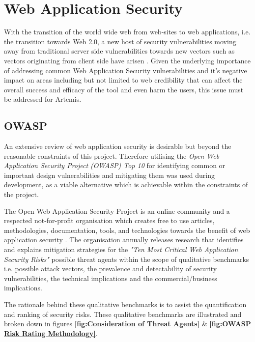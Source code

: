 \section{Web Application Security}

With the transition of the world wide web from web-sites to web applications, i.e. the transition towards Web 2.0, a new host of security vulnerabilities moving away from traditional server side vulnerabilities towards new vectors such as vectors originating from client side have arisen \cite{Dayfdd2011}. Given the underlying importance of addressing common Web Application Security vulnerabilities \cite{Dayfdd2011} and it's negative impact on areas including but not limited to web credibility \cite{Fogg2002a,Fogg1999} that can affect the overall success and efficacy of the tool and even harm the users, this issue must be addressed for Artemis.

\subsection{OWASP}

An extensive review of web application security is desirable but beyond the reasonable constraints of this project. Therefore  utilising the \textit{Open Web Application Security Project (OWASP) Top 10} \cite{OWASP2017} for identifying common or important design vulnerabilities and mitigating them was  used during development, as a viable alternative which is achievable within the constraints of the project.

The Open Web Application Security Project is an online community  and  a respected  not-for-profit organisation which creates free to use articles, methodologies, documentation, tools, and technologies towards the benefit of web application security \cite{OWASP}. The organisation  annually releases research that identifies and explains mitigation strategies for the \textit{"Ten Most Critical Web Application Security Risks"}\cite{OWASP2017} possible threat agents within the scope of qualitative benchmarks i.e. possible attack vectors, the prevalence and detectability of security vulnerabilities, the technical implications and the commercial/business implications.

The rationale behind these qualitative benchmarks is to assist the quantification and ranking of security risks. These qualitative benchmarks are illustrated and broken down in figures \textbf{\ref{fig:Consideration of Threat Agents}} \& \textbf{\ref{fig:OWASP Risk Rating Methodology}}.

